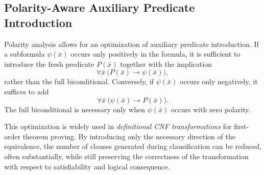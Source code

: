 \subsection{Polarity-Aware Auxiliary Predicate Introduction}

Polarity analysis allows for an optimization of auxiliary predicate introduction. If a subformula \(\psi(\bar{x})\) occurs only positively in the formula, it is sufficient to introduce the fresh predicate \(P(\bar{x})\) together with the implication
\[
\forall \bar{x}\ \big(P(\bar{x}) \rightarrow \psi(\bar{x})\big),
\]
rather than the full biconditional. Conversely, if \(\psi(\bar{x})\) occurs only negatively, it suffices to add
\[
\forall \bar{x}\ \big(\psi(\bar{x}) \rightarrow P(\bar{x})\big).
\]
The full biconditional is necessary only when \(\psi(\bar{x})\) occurs with zero polarity.

This optimization is widely used in \emph{definitional CNF transformations} for first-order theorem proving. By introducing only the necessary direction of the equivalence, the number of clauses generated during clausification can be reduced, often substantially, while still preserving the correctness of the transformation with respect to satisfiability and logical consequence.







